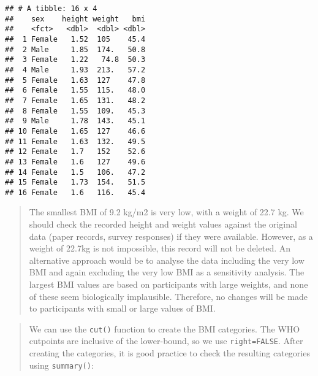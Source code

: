 \documentclass[
]{memoir}
\newenvironment{Shaded}{\begin{snugshade}}{\end{snugshade}}
\newcommand{\AttributeTok}[1]{\textcolor[rgb]{0.77,0.63,0.00}{#1}}
\newcommand{\ConstantTok}[1]{\textcolor[rgb]{0.00,0.00,0.00}{#1}}
\newcommand{\DecValTok}[1]{\textcolor[rgb]{0.00,0.00,0.81}{#1}}
\newcommand{\FloatTok}[1]{\textcolor[rgb]{0.00,0.00,0.81}{#1}}
\newcommand{\FunctionTok}[1]{\textcolor[rgb]{0.00,0.00,0.00}{#1}}
\newcommand{\NormalTok}[1]{#1}
\newcommand{\OtherTok}[1]{\textcolor[rgb]{0.56,0.35,0.01}{#1}}
\newcommand{\SpecialCharTok}[1]{\textcolor[rgb]{0.00,0.00,0.00}{#1}}
\begin{document}
\begin{verbatim}
## # A tibble: 16 x 4
##    sex    height weight   bmi
##    <fct>   <dbl>  <dbl> <dbl>
##  1 Female   1.52  105    45.4
##  2 Male     1.85  174.   50.8
##  3 Female   1.22   74.8  50.3
##  4 Male     1.93  213.   57.2
##  5 Female   1.63  127    47.8
##  6 Female   1.55  115.   48.0
##  7 Female   1.65  131.   48.2
##  8 Female   1.55  109.   45.3
##  9 Male     1.78  143.   45.1
## 10 Female   1.65  127    46.6
## 11 Female   1.63  132.   49.5
## 12 Female   1.7   152    52.6
## 13 Female   1.6   127    49.6
## 14 Female   1.5   106.   47.2
## 15 Female   1.73  154.   51.5
## 16 Female   1.6   116.   45.4
\end{verbatim}

\begin{quote}
The smallest BMI of 9.2 kg/m2 is very low, with a weight of 22.7 kg. We should check the recorded height and weight values against the original data (paper records, survey responses) if they were available. However, as a weight of 22.7kg is not impossible, this record will not be deleted. An alternative approach would be to analyse the data including the very low BMI and again excluding the very low BMI as a sensitivity analysis.
The largest BMI values are based on participants with large weights, and none of these seem biologically implausible. Therefore, no changes will be made to participants with small or large values of BMI.
\end{quote}

\begin{quote}
We can use the \texttt{cut()} function to create the BMI categories. The WHO cutpoints are inclusive of the lower-bound, so we use \texttt{right=FALSE}. After creating the categories, it is good practice to check the resulting categories using \texttt{summary()}:
\end{quote}

\begin{Shaded}
\end{Shaded}
\end{document}
